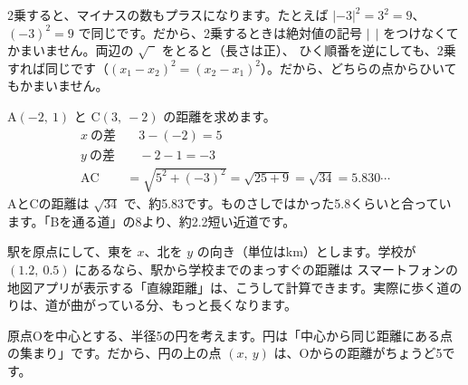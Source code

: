 \vspace{4pt}
2乗すると、マイナスの数もプラスになります。たとえば $|-3|^2=3^2=9$、$(-3)^2=9$ で同じです。だから、2乗するときは絶対値の記号 $|\ \ |$ をつけなくてかまいません。両辺の $\sqrt{\phantom{2}}$ をとると（長さは正）、
ひく順番を逆にしても、2乗すれば同じです（$(x_1-x_2)^2=(x_2-x_1)^2$）。だから、どちらの点からひいてもかまいません。

A$(-2,\ 1)$ と C$(3,\ -2)$ の距離を求めます。
\begin{align*}
x\ \text{の差}&\quad 3-(-2)=5\\
y\ \text{の差}&\quad -2-1=-3\\
\mathrm{AC}&=\sqrt{5^2+(-3)^2}=\sqrt{25+9}=\sqrt{34}=5.830\cdots
\end{align*}
AとCの距離は $\sqrt{34}$ で、約5.83です。ものさしではかった5.8くらいと合っています。「Bを通る道」の8より、約2.2短い近道です。

駅を原点にして、東を $x$、北を $y$ の向き（単位はkm）とします。学校が $(1.2,\ 0.5)$ にあるなら、駅から学校までのまっすぐの距離は
スマートフォンの地図アプリが表示する「直線距離」は、こうして計算できます。実際に歩く道のりは、道が曲がっている分、もっと長くなります。

\label{bk:4-4:en}原点Oを中心とする、半径5の円を考えます。円は「中心から同じ距離にある点の集まり」です。だから、円の上の点 $(x,\ y)$ は、Oからの距離がちょうど5です。

